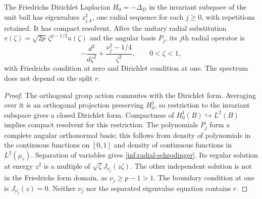 \begin{proposition}\label{inf:ball-spectrum}
The Friedrichs Dirichlet Laplacian $H_0=-\Delta_D$ in the invariant
subspace of the unit ball has eigenvalues $z_{j,k}^2$, one radial
sequence for each $j\ge0$, with repetitions retained. It has compact
resolvent. After the unitary radial substitution
$v(\zeta)=\sqrt{2p}\,\zeta^{p-1/2}u(\zeta)$ and the angular basis $P_j$, its
$j$th radial operator is
\begin{equation}\label{inf:radial-schrodinger}
 -\frac{d^2}{d\zeta^2}+\frac{\nu_j^2-1/4}{\zeta^2},
 \qquad 0<\zeta<1,
\end{equation}
with Friedrichs condition at zero and Dirichlet condition at one.
The spectrum does not depend on the split $r$.
\end{proposition}
\begin{proof}
The orthogonal group action commutes with the Dirichlet form. Averaging
over it is an orthogonal projection preserving $H^1_0$, so restriction
to the invariant subspace gives a closed Dirichlet form. Compactness of
$H^1_0(B)\hookrightarrow L^2(B)$ implies compact resolvent for this
restriction. The polynomials $P_j$ form a complete angular orthonormal
basis; this follows from density of polynomials in the continuous
functions on $[0,1]$ and density of continuous functions in $L^2(\mu_r)$.
Separation of variables gives \eqref{inf:radial-schrodinger}. Its
regular solution at energy $z^2$ is a multiple of
$\sqrt\zeta J_{\nu_j}(z\zeta)$. The other independent solution is not
in the Friedrichs form domain, as $\nu_j\ge p-1>1$.
The boundary condition at one is $J_{\nu_j}(z)=0$.
Neither $\nu_j$ nor the separated eigenvalue equation contains $r$.
\end{proof}

